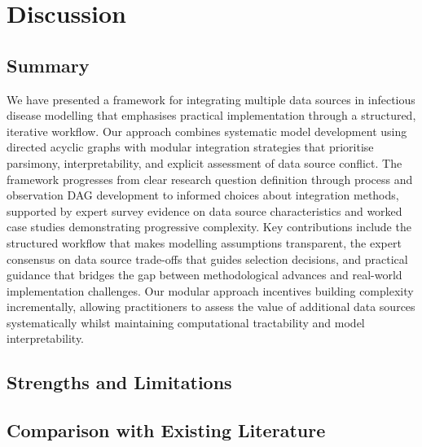 \documentclass{article}
\begin{document}
\section{Discussion}

\subsection{Summary}

We have presented a framework for integrating multiple data sources in infectious disease modelling that emphasises practical implementation through a structured, iterative workflow.
Our approach combines systematic model development using directed acyclic graphs with modular integration strategies that prioritise parsimony, interpretability, and explicit assessment of data source conflict.
The framework progresses from clear research question definition through process and observation DAG development to informed choices about integration methods, supported by expert survey evidence on data source characteristics and worked case studies demonstrating progressive complexity.
Key contributions include the structured workflow that makes modelling assumptions transparent, the expert consensus on data source trade-offs that guides selection decisions, and practical guidance that bridges the gap between methodological advances and real-world implementation challenges.
Our modular approach incentives building complexity incrementally, allowing practitioners to assess the value of additional data sources systematically whilst maintaining computational tractability and model interpretability.

\subsection{Strengths and Limitations}

\subsection{Comparison with Existing Literature}
\end{document}
